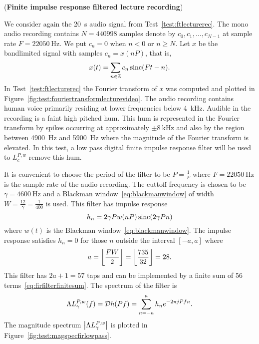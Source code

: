 \begin{test}\label{test:firfilteredlecturerec}
(\textbf{Finite impulse response filtered lecture recording})

We consider again the \SI{20}{\second} audio signal from Test~\ref{test:ftlecturerec}.  The mono audio recording contains $N = 440998$ samples denote by $c_0,c_1,\dots,c_{N-1}$ at sample rate $F = \SI{22050}{\hertz}$.  We put $c_n = 0$ when $n < 0$ or $n \geq N$.  Let $x$ be the bandlimited signal with samples $c_n = x(nP)$, that is,
\[
x(t) = \sum_{n \in {\mathbb Z}} c_n \operatorname{sinc}(Ft - n).
\]  
In Test~\ref{test:ftlecturerec} the Fourier transform of $x$ was computed and plotted in Figure~\ref{fig:test:fouriertransformlecturevideo}.  The audio recording contains human voice primarily residing at lower frequencies below \SI{4}{\kilo\hertz}.  Audible in the recording is a faint high pitched hum.  This hum is represented in the Fourier transform by spikes occurring at approximately $\pm\SI{8}{\kilo\hertz}$ and also by the region between \SI{4900}{\hertz} and \SI{5900}{\hertz} where the magnitude of the Fourier transform is elevated.  In this test, a low pass digital finite impulse response filter will be used to $L_{c}^{P,w}$ remove this hum.

It is convenient to choose the period of the filter to be $P = \tfrac{1}{F}$ where $F = \SI{22050}{\hertz}$ is the sample rate of the audio recording.  The cuttoff frequency is chosen to be $\gamma = \SI{4600}{\hertz}$ and a Blackman window~\eqref{eq:blackmanwindow} of width $W=\tfrac{12}{\gamma} = \tfrac{1}{400}$ is used.  This filter has impulse response
\[
h_n = 2 \gamma P w( nP ) \operatorname{sinc}( 2\gamma P n)
\]
where $w(t)$ is the Blackman window~\eqref{eq:blackmanwindow}.  The impulse response satisfies $h_n = 0$ for those $n$ outside the interval $[-a,a]$ where
\[
a = {\left\lfloor \frac{FW}{2} \right\rfloor} = {\left\lfloor \frac{735}{32} \right\rfloor} = 28.
\] 
This filter has $2a+1 = 57$ taps and can be implemented by a finite sum of 56 terms~\eqref{eq:firfilterfinitesum}.  The spectrum of the filter is
\[
\Lambda L_{\gamma}^{P,w}(f) = {\mathcal D} h(Pf) = \sum_{n = -a}^a h_n e^{-2\pi j P f n}. 
\]
The magnitude spectrum $\left\vert \Lambda L_{\gamma}^{P,w} \right\vert$ is plotted in Figure~\ref{fig:test:magspecfirlowpass}.


\end{test}
